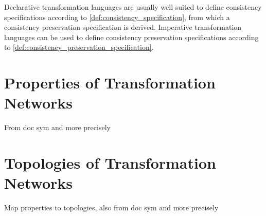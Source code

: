 
Declarative transformation languages are usually well suited to define consistency specifications according to \autoref{def:consistency_specification}, 
from which a consistency preservation specification is %
derived. 
Imperative transformation languages can be used to define consistency preservation specifications according to \autoref{def:consistency_preservation_specification}. 



\section{Properties of Transformation Networks}
From doc sym and more precisely



\section{Topologies of Transformation Networks}
Map properties to topologies, also from doc sym and more precisely